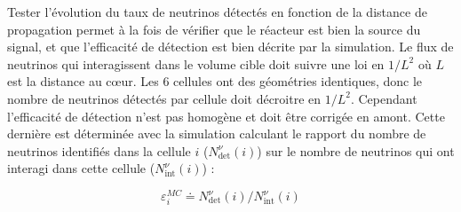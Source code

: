 {\clearpage


}

Tester l'évolution du taux de neutrinos détectés en fonction de la distance de propagation permet à la fois de vérifier que le réacteur est bien la source du signal, et que l'efficacité de détection est bien décrite par la simulation. Le flux de neutrinos qui interagissent dans le volume cible doit suivre une loi en $1/L^2$ où $L$ est la distance au c\oe ur. Les 6 cellules ont des géométries identiques, donc le nombre de neutrinos détectés par cellule doit décroitre en $1/L^2$. Cependant l'efficacité de détection n'est pas homogène et doit être corrigée en amont. Cette dernière est déterminée avec la simulation calculant le rapport du nombre de neutrinos identifiés dans la cellule $i$ ($N^\nu_\textrm{det}(i)$) sur le nombre de neutrinos qui ont interagi dans cette cellule ($N^\nu_\textrm{int}(i)$) :

\begin{equation}
    \varepsilon_i^{MC} \doteq N^\nu_\textrm{det}(i) /N^\nu_\textrm{int}(i)
\end{equation}

